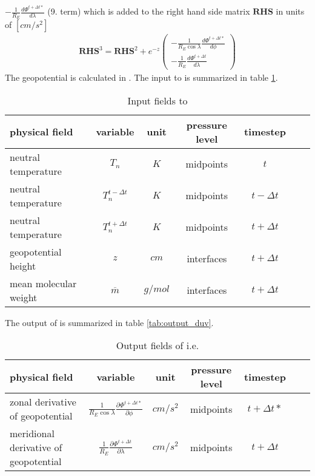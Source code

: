 $- \frac{1}{R_E } \frac{d \Phi^{t+\Delta t*}}{d \lambda} $ (9. term)
which is added to the right hand side matrix $\mathbf{RHS}$ in units of $[cm/s^2]$\\
%
\begin{gather}
  \mathbf{RHS}^3= \mathbf{RHS}^2 + e^{-z}
   \begin{pmatrix}
     - \frac{1}{R_E \cos \lambda} \frac{d \Phi^{t+\Delta t*}}{d \phi} \\
     - \frac{1}{R_E } \frac{d \Phi^{t+\Delta t}}{d \lambda}
   \end{pmatrix}
\end{gather}
%
The geopotential is calculated in . The input to
 is summarized in table \ref{tab:input_glp}.
%
\begin{table}[tb]
\begin{tabular}{|p{3.5cm} ||c|c|c|c|c|c|} \hline
physical field               & variable        & unit&pressure
level& timestep
\\ \hline \hline
%
neutral temperature &       $T_n$              & $K$   &  midpoints & $t$\\
neutral temperature &       $T_n^{t-\Delta t}$ & $K$   &  midpoints & $t-\Delta t$\\
neutral temperature &       $T_n^{t+\Delta t}$ & $K$   &  midpoints & $t+\Delta t$\\
geopotential height&  $z$     & $cm$   & interfaces  & $t+\Delta t$\\
mean molecular weight&       {$\overline{m}$}     & $g/mol$   &
interfaces  &$t + \Delta t$
 \\ \hline
\end{tabular}
\caption{Input fields to } \label{tab:input_glp}
\end{table}
%
The output of  is summarized in table
\ref{tab:output_duv}.
%
\begin{table}[tb]
\begin{tabular}{|p{3.5cm} ||c|c|c|c|c|c|} \hline
physical field               & variable        & unit&pressure
level& timestep \\ \hline \hline
zonal derivative of geopotential      & {$\frac{1}{R_E \cos \lambda} \frac{\partial \Phi^{t+\Delta t*}}{\partial \phi}$}     & $cm/s^2$   & midpoints  & $t+\Delta t*$ \\
meridional derivative of geopotential & {$\frac{1}{R_E }
\frac{\partial \Phi^{t+\Delta t}}{\partial \lambda}$}    & $cm/s^2$
& midpoints  & $t+\Delta t$
\\ \hline
\end{tabular}
\caption{Output fields of  i.e. } \label{tab:output glp}
\end{table}
